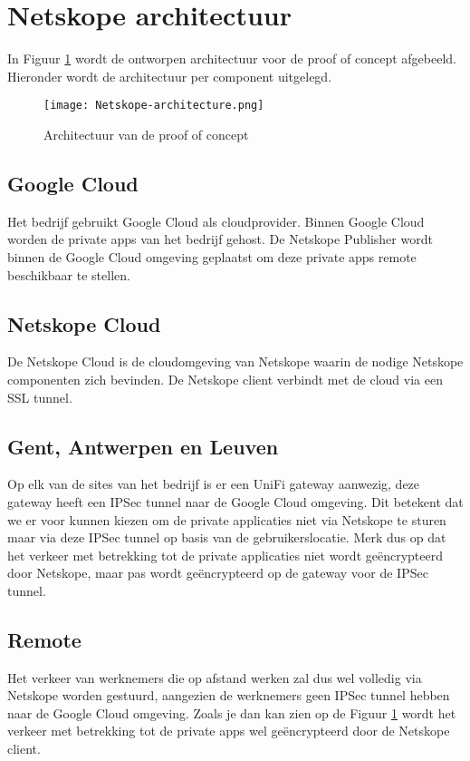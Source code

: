 \section{Netskope architectuur}
In Figuur \ref{fig:poc-architecture} wordt de ontworpen architectuur voor de proof of concept afgebeeld. Hieronder wordt de architectuur per component uitgelegd.
\begin{figure}[h!]
    \centering
    \texttt{[image: Netskope-architecture.png]}
    \caption[Architectuur van de POC]{Architectuur van de proof of concept}
    \label{fig:poc-architecture}
\end{figure}
  
\subsection{Google Cloud}
Het bedrijf gebruikt Google Cloud als cloudprovider. Binnen Google Cloud worden de private apps van het bedrijf gehost. De Netskope Publisher wordt binnen de Google Cloud omgeving geplaatst om deze private apps remote beschikbaar te stellen. 

\subsection{Netskope Cloud}
De Netskope Cloud is de cloudomgeving van Netskope waarin de nodige Netskope componenten zich bevinden. De Netskope client verbindt met de cloud via een SSL tunnel.

\subsection{Gent, Antwerpen en Leuven}
Op elk van de sites van het bedrijf is er een UniFi gateway aanwezig, deze gateway heeft een IPSec tunnel naar de Google Cloud omgeving. Dit betekent dat we er voor kunnen kiezen om de private applicaties niet via Netskope te sturen maar via deze IPSec tunnel op basis van de gebruikerslocatie. Merk dus op dat het verkeer met betrekking tot de private applicaties niet wordt geëncrypteerd door Netskope, maar pas wordt geëncrypteerd op de gateway voor de IPSec tunnel.

\subsection{Remote}
Het verkeer van werknemers die op afstand werken zal dus wel volledig via Netskope worden gestuurd, aangezien de werknemers geen IPSec tunnel hebben naar de Google Cloud omgeving. Zoals je dan kan zien op de Figuur \ref{fig:poc-architecture} wordt het verkeer met betrekking tot de private apps wel geëncrypteerd door de Netskope client.

